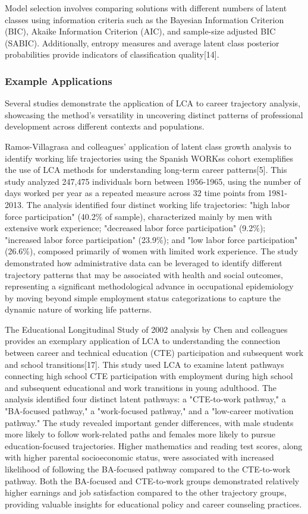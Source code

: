 \documentclass[main.tex]{subfiles}
\begin{document}
Model selection involves comparing solutions with different numbers of latent classes using information criteria such as the Bayesian Information Criterion (BIC), Akaike Information Criterion (AIC), and sample-size adjusted BIC (SABIC). Additionally, entropy measures and average latent class posterior probabilities provide indicators of classification quality[14].

\subsubsection{Example Applications}

Several studies demonstrate the application of LCA to career trajectory analysis, showcasing the method's versatility in uncovering distinct patterns of professional development across different contexts and populations.

Ramos-Villagrasa and colleagues' application of latent class growth analysis to identify working life trajectories using the Spanish WORKss cohort exemplifies the use of LCA methods for understanding long-term career patterns[5]. This study analyzed 247,475 individuals born between 1956-1965, using the number of days worked per year as a repeated measure across 32 time points from 1981-2013. The analysis identified four distinct working life trajectories: "high labor force participation" (40.2\% of sample), characterized mainly by men with extensive work experience; "decreased labor force participation" (9.2\%); "increased labor force participation" (23.9\%); and "low labor force participation" (26.6\%), composed primarily of women with limited work experience. The study demonstrated how administrative data can be leveraged to identify different trajectory patterns that may be associated with health and social outcomes, representing a significant methodological advance in occupational epidemiology by moving beyond simple employment status categorizations to capture the dynamic nature of working life patterns.

The Educational Longitudinal Study of 2002 analysis by Chen and colleagues provides an exemplary application of LCA to understanding the connection between career and technical education (CTE) participation and subsequent work and school transitions[17]. This study used LCA to examine latent pathways connecting high school CTE participation with employment during high school and subsequent educational and work transitions in young adulthood. The analysis identified four distinct latent pathways: a "CTE-to-work pathway," a "BA-focused pathway," a "work-focused pathway," and a "low-career motivation pathway." The study revealed important gender differences, with male students more likely to follow work-related paths and females more likely to pursue education-focused trajectories. Higher mathematics and reading test scores, along with higher parental socioeconomic status, were associated with increased likelihood of following the BA-focused pathway compared to the CTE-to-work pathway. Both the BA-focused and CTE-to-work groups demonstrated relatively higher earnings and job satisfaction compared to the other trajectory groups, providing valuable insights for educational policy and career counseling practices.
\end{document}
